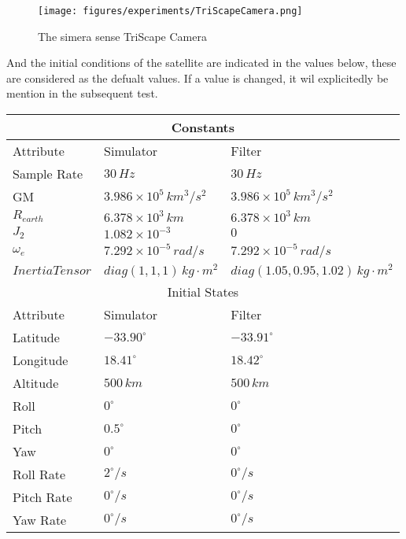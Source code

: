 \begin{figure}[H]
    \centering
    \texttt{[image: figures/experiments/TriScapeCamera.png]}
    \caption{The simera sense TriScape Camera}
    \label{fig:TSC}
\end{figure}


And the initial conditions of the satellite are indicated in the values below, these are considered as the defualt values. If a value is changed, it wil explicitedly be mention in the subsequent test.

\begin{table}[H]
    \begin{center}
        \begin{tabular}{|l|l|l|}
        \hline
        \multicolumn{3}{|c|}{Constants} \\
        \hline
        Attribute    & Simulator                         & Filter \\
        \hline
        Sample Rate  & $30 \, Hz $                          & $30 \, Hz$ \\
        GM           & $3.986 \times 10^5 \, km^3/s^2$   & $3.986 \times 10^5 \, km^3/s^2$ \\
        $R_{earth}$  & $6.378 \times 10^3 \, km$         & $6.378 \times 10^3 \, km$ \\
        $J_2$        & $1.082 \times 10^{-3}$            & $0$ \\
        $\omega_e$   & $7.292 \times 10^{-5} \, rad/s$   & $7.292 \times 10^{-5} \, rad/s$ \\
        $Inertia Tensor$ & $diag(1,1,1) \, kg\cdot m^{2}$     & $diag(1.05,0.95,1.02) \, kg\cdot m^{2}$ \\
        \hline
        \multicolumn{3}{|c|}{Initial States} \\
        \hline
        Attribute    & Simulator           & Filter \\
        \hline
        Latitude     & $-33.90^{\circ}$    & $-33.91^{\circ}$ \\
        Longitude    & $18.41^{\circ}$     & $18.42^{\circ}$ \\
        Altitude     & $500 \, km$         & $500 \, km$ \\
        Roll         & $0^{\circ}$         & $0^{\circ}$ \\
        Pitch        & $0.5^{\circ}$       & $0^{\circ}$ \\
        Yaw          & $0^{\circ}$         & $0^{\circ}$ \\
        Roll Rate    & $2^{\circ}/s$       & $0^{\circ}/s$ \\
        Pitch Rate   & $0^{\circ}/s$       & $0^{\circ}/s$ \\
        Yaw Rate     & $0^{\circ}/s$       & $0^{\circ}/s$ \\
        \hline
        \end{tabular}
    \end{center}
\end{table}

